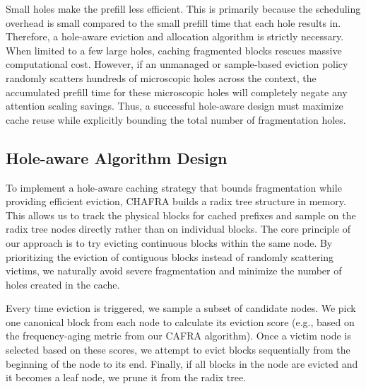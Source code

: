 \documentclass[letterpaper,twocolumn,10pt]{article}
\newcommand{\sys}{CHAFRA\xspace}
\newcommand{\algo}{CAFRA\xspace}
\begin{document}
Small holes make the prefill less efficient.
This is primarily because the scheduling overhead is small compared to the small
prefill time that each hole results in.
Therefore, a hole-aware eviction and allocation algorithm is strictly necessary.
When limited to a few large holes, caching fragmented blocks rescues massive
computational cost.
However, if an unmanaged or sample-based eviction policy randomly scatters
hundreds of microscopic holes across the context, the accumulated prefill
time for these microscopic holes will completely negate any attention scaling
savings.
Thus, a successful hole-aware design must maximize cache reuse while explicitly
bounding the total number of fragmentation holes.

\subsection{Hole-aware Algorithm Design}
\label{sec:hole-aware-algorithm-design}

To implement a hole-aware caching strategy that bounds fragmentation while
providing efficient eviction, \sys builds a radix tree structure in memory.
This allows us to track the physical blocks for cached prefixes and sample
on the radix tree nodes directly rather than on individual blocks.
The core principle of our approach is to try evicting continuous blocks within
the same node. By prioritizing the eviction of contiguous blocks instead of
randomly scattering victims, we naturally avoid severe fragmentation and
minimize the number of holes created in the cache.

Every time eviction is triggered, we sample a subset of candidate nodes. We pick
one canonical block from each node to calculate its eviction score (e.g.,
based on the frequency-aging metric from our \algo algorithm). Once a victim
node is selected based on
these scores, we attempt to evict blocks sequentially from the beginning of the
node to its end. Finally, if all blocks in the node are evicted and it becomes
a leaf node, we prune it from the radix tree.
\end{document}
